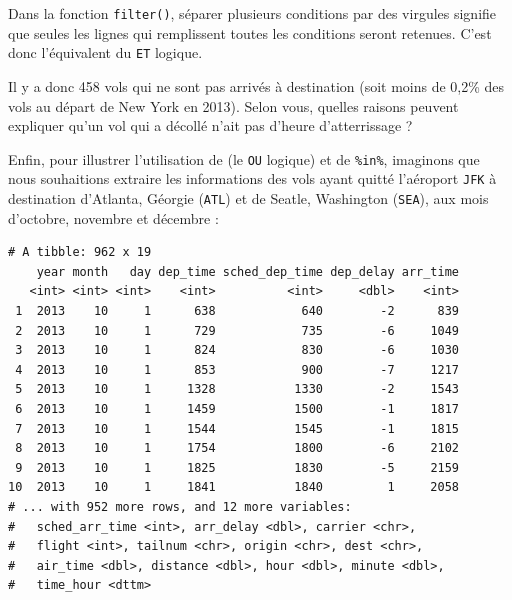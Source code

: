 \documentclass[
  a4paper,
]{article}
\newenvironment{Shaded}{\begin{snugshade}}{\end{snugshade}}
\newcommand{\DecValTok}[1]{\textcolor[rgb]{0.69,0.50,0.00}{#1}}
\newcommand{\KeywordTok}[1]{\textcolor[rgb]{0.12,0.11,0.11}{\textbf{#1}}}
\newcommand{\NormalTok}[1]{\textcolor[rgb]{0.12,0.11,0.11}{#1}}
\newcommand{\OperatorTok}[1]{\textcolor[rgb]{0.12,0.11,0.11}{#1}}
\newcommand{\StringTok}[1]{\textcolor[rgb]{0.75,0.01,0.01}{#1}}
\begin{document}
Dans la fonction \texttt{filter()}, séparer plusieurs conditions par des virgules signifie que seules les lignes qui remplissent toutes les conditions seront retenues. C'est donc l'équivalent du \texttt{ET} logique.

Il y a donc 458 vols qui ne sont pas arrivés à destination (soit moins de 0,2\% des vols au départ de New York en 2013). Selon vous, quelles raisons peuvent expliquer qu'un vol qui a décollé n'ait pas d'heure d'atterrissage ?

Enfin, pour illustrer l'utilisation de \texttt{\textbar{}} (le \texttt{OU} logique) et de \texttt{\%in\%}, imaginons que nous souhaitions extraire les informations des vols ayant quitté l'aéroport \texttt{JFK} à destination d'Atlanta, Géorgie (\texttt{ATL}) et de Seatle, Washington (\texttt{SEA}), aux mois d'octobre, novembre et décembre :

\begin{Shaded}
\end{Shaded}

\begin{verbatim}
# A tibble: 962 x 19
    year month   day dep_time sched_dep_time dep_delay arr_time
   <int> <int> <int>    <int>          <int>     <dbl>    <int>
 1  2013    10     1      638            640        -2      839
 2  2013    10     1      729            735        -6     1049
 3  2013    10     1      824            830        -6     1030
 4  2013    10     1      853            900        -7     1217
 5  2013    10     1     1328           1330        -2     1543
 6  2013    10     1     1459           1500        -1     1817
 7  2013    10     1     1544           1545        -1     1815
 8  2013    10     1     1754           1800        -6     2102
 9  2013    10     1     1825           1830        -5     2159
10  2013    10     1     1841           1840         1     2058
# ... with 952 more rows, and 12 more variables:
#   sched_arr_time <int>, arr_delay <dbl>, carrier <chr>,
#   flight <int>, tailnum <chr>, origin <chr>, dest <chr>,
#   air_time <dbl>, distance <dbl>, hour <dbl>, minute <dbl>,
#   time_hour <dttm>
\end{verbatim}
\end{document}
